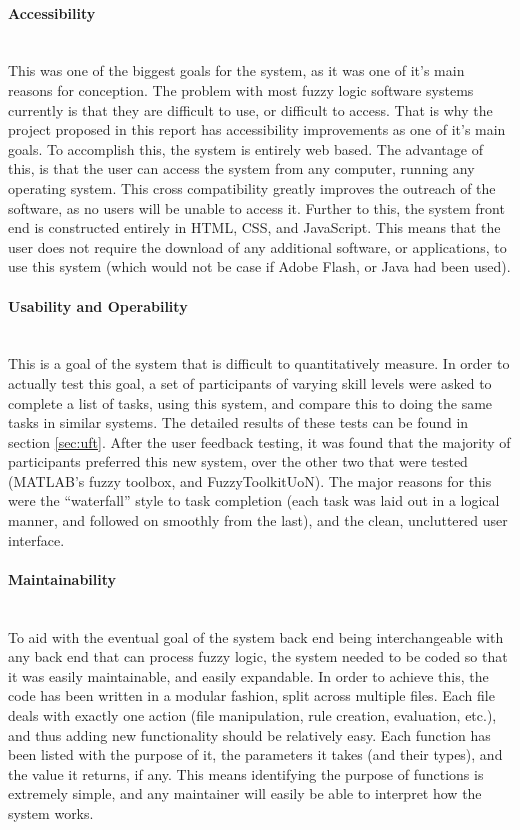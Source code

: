 \paragraph{Accessibility}\ \\
This was one of the biggest goals for the system, as it was one of it's main reasons for conception. The problem with most fuzzy logic software systems currently is that they are difficult to use, or difficult to access. That is why the project proposed in this report has accessibility improvements as one of it's main goals. To accomplish this, the system is entirely web based. The advantage of this, is that the user can access the system from any computer, running any operating system. This cross compatibility greatly improves the outreach of the software, as no users will be unable to access it. Further to this, the system front end is constructed entirely in HTML, CSS, and JavaScript. This means that the user does not require the download of any additional software, or applications, to use this system (which would not be case if Adobe Flash, or Java had been used). 

\paragraph{Usability and Operability}\ \\
This is a goal of the system that is difficult to quantitatively measure. In order to actually test this goal, a set of participants of varying skill levels were asked to complete a list of tasks, using this system, and compare this to doing the same tasks in similar systems. The detailed results of these tests can be found in section \ref{sec:uft}. After the user feedback testing, it was found that the majority of participants preferred this new system, over the other two that were tested (MATLAB's fuzzy toolbox, and FuzzyToolkitUoN). The major reasons for this were the ``waterfall'' style to task completion (each task was laid out in a logical manner, and followed on smoothly from the last), and the clean, uncluttered user interface. 

\newpage
\paragraph{Maintainability}\ \\
To aid with the eventual goal of the system back end being interchangeable with any back end that can process fuzzy logic, the system needed to be coded so that it was easily maintainable, and easily expandable. In order to achieve this, the code has been written in a modular fashion, split across multiple files. Each file deals with exactly one action (file manipulation, rule creation, evaluation, etc.), and thus adding new functionality should be relatively easy. Each function has been listed with the purpose of it, the parameters it takes (and their types), and the value it returns, if any. This means identifying the purpose of functions is extremely simple, and any maintainer will easily be able to interpret how the system works. 


